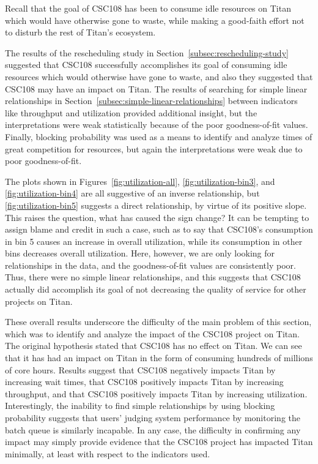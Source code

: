 


Recall that the goal of CSC108 has been to consume idle resources on Titan
which would have otherwise gone to waste, while making a good-faith effort not
to disturb the rest of Titan's ecosystem.

The results of the rescheduling study in
Section~\ref{subsec:rescheduling-study} suggested that CSC108 successfully
accomplishes its goal of consuming idle resources which would otherwise have
gone to waste, and also they suggested that CSC108 may have an impact on Titan.
The results of searching for simple linear relationships in
Section~\ref{subsec:simple-linear-relationships} between indicators like
throughput and utilization provided additional insight, but the interpretations
were weak statistically because of the poor goodness-of-fit values. Finally,
blocking probability was used as a means to identify and analyze times of great
competition for resources, but again the interpretations were weak due to poor
goodness-of-fit.


The plots shown in Figures~\ref{fig:utilization-all},
\ref{fig:utilization-bin3}, and \ref{fig:utilization-bin4} are all suggestive
of an inverse relationship, but \ref{fig:utilization-bin5} suggests a direct
relationship, by virtue of its positive slope. This raises the question, what
has caused the sign change? It can be tempting to assign blame and credit in
such a case, such as to say that CSC108's consumption in bin 5 causes an
increase in overall utilization, while its consumption in other bins decreases
overall utilization. Here, however, we are only looking for relationships in
the data, and the goodness-of-fit values are consistently poor. Thus, there
were no simple linear relationships, and this suggests that CSC108 actually did
accomplish its goal of not decreasing the quality of service for other projects
on Titan.

These overall results underscore the difficulty of the main problem of this
section, which was to identify and analyze the impact of the CSC108 project on
Titan. The original hypothesis stated that CSC108 has no effect on Titan. We
can see that it has had an impact on Titan in the form of consuming hundreds of
millions of core hours. Results suggest that CSC108 negatively impacts Titan by
increasing wait times, that CSC108 positively impacts Titan by increasing
throughput, and that CSC108 positively impacts Titan by increasing utilization.
Interestingly, the inability to find simple relationships by using blocking
probability suggests that users' judging system performance by monitoring the
batch queue is similarly incapable. In any case, the difficulty in confirming
any impact may simply provide evidence that the CSC108 project has impacted
Titan minimally, at least with respect to the indicators used.

